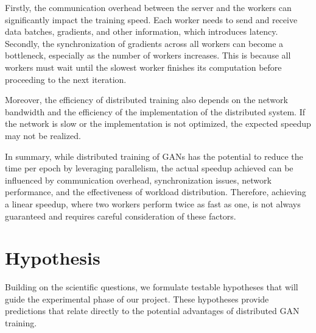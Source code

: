 Firstly, the communication overhead between the server and the workers can significantly impact the training speed. Each worker needs to send and receive data batches, gradients, and other information, which introduces latency. Secondly, the synchronization of gradients across all workers can become a bottleneck, especially as the number of workers increases. This is because all workers must wait until the slowest worker finishes its computation before proceeding to the next iteration.

Moreover, the efficiency of distributed training also depends on the network bandwidth and the efficiency of the implementation of the distributed system. If the network is slow or the implementation is not optimized, the expected speedup may not be realized.

In summary, while distributed training of GANs has the potential to reduce the time per epoch by leveraging parallelism, the actual speedup achieved can be influenced by communication overhead, synchronization issues, network performance, and the effectiveness of workload distribution. Therefore, achieving a linear speedup, where two workers perform twice as fast as one, is not always guaranteed and requires careful consideration of these factors.


\newpage

\section{Hypothesis}
Building on the scientific questions, we formulate testable hypotheses that will guide the experimental phase of our project. These hypotheses provide  predictions that relate directly to the potential advantages of distributed GAN training.


